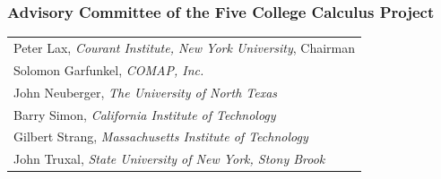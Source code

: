 \thispagestyle{empty}

\mbox{}




\subsubsection{Advisory Committee of the Five College Calculus Project}


\begin{tabular}{l}
Peter Lax, \emph{Courant Institute, New York University}, Chairman \\
Solomon Garfunkel, \emph{COMAP, Inc.} \\
John Neuberger, \emph{The University of North Texas} \\
Barry Simon, \emph{California Institute of Technology} \\
Gilbert Strang, \emph{Massachusetts Institute of Technology} \\
John Truxal, \emph{State University of New York, Stony Brook}
\end{tabular}

